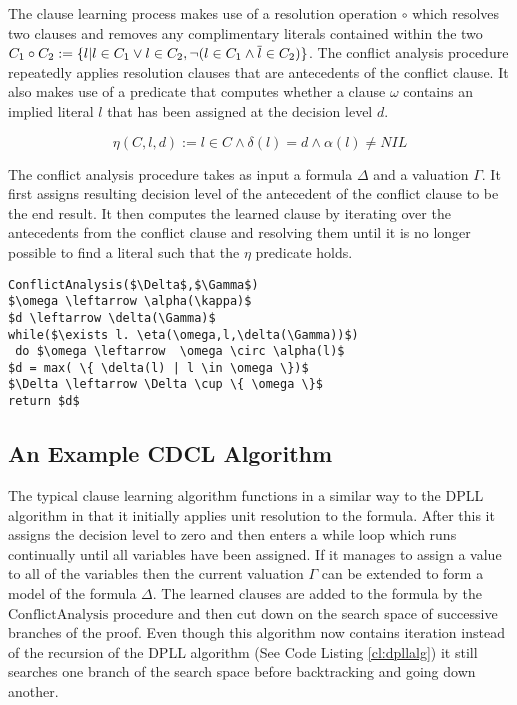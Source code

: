 The clause learning process makes use of a resolution operation $\circ$ which resolves two clauses and removes any complimentary literals contained within the two $C_1 \circ C_2 := \{l | l \in C_1 \vee l \in C_2, \neg (l \in C_1 \wedge \overline{l} \in C_2 )\}$. The conflict analysis procedure repeatedly applies resolution clauses that are antecedents of the conflict clause. It also makes use of a predicate that computes whether a clause $\omega$ contains an implied literal $l$ that has been assigned at the decision level $d$.

$$\eta(C,l,d) := l \in C \wedge \delta(l) = d \wedge \alpha(l) \neq NIL$$

The conflict analysis procedure takes as input a formula $\Delta$ and a valuation $\Gamma$. It first assigns resulting decision level of the antecedent of the conflict clause to be the end result. It then computes the learned clause by iterating over the antecedents from the conflict clause and resolving them until it is no longer possible to find a literal such that the $\eta$ predicate holds.

\begin{lstlisting}[caption = Conflict Analysis Procedure, mathescape]
ConflictAnalysis($\Delta$,$\Gamma$) 
$\omega \leftarrow \alpha(\kappa)$
$d \leftarrow \delta(\Gamma)$
while($\exists l. \eta(\omega,l,\delta(\Gamma))$)
 do $\omega \leftarrow  \omega \circ \alpha(l)$
$d = max( \{ \delta(l) | l \in \omega \})$
$\Delta \leftarrow \Delta \cup \{ \omega \}$
return $d$
\end{lstlisting}


\subsection*{An Example CDCL Algorithm}

The typical clause learning algorithm functions in a similar way to the DPLL algorithm in that it initially applies unit resolution to the formula. After this it assigns the decision level to zero and then enters a while loop which runs continually until all variables have been assigned. If it manages to assign a value to all of the variables then the current valuation $\Gamma$ can be extended to form a model of the formula $\Delta$. The learned clauses are added to the formula by the $\mathrm{ConflictAnalysis}$ procedure and then cut down on the search space of successive branches of the proof. Even though this algorithm now contains iteration instead of the recursion of the DPLL algorithm (See Code Listing \ref{cl:dpllalg})  it still searches one branch of the search space before backtracking and going down another.


